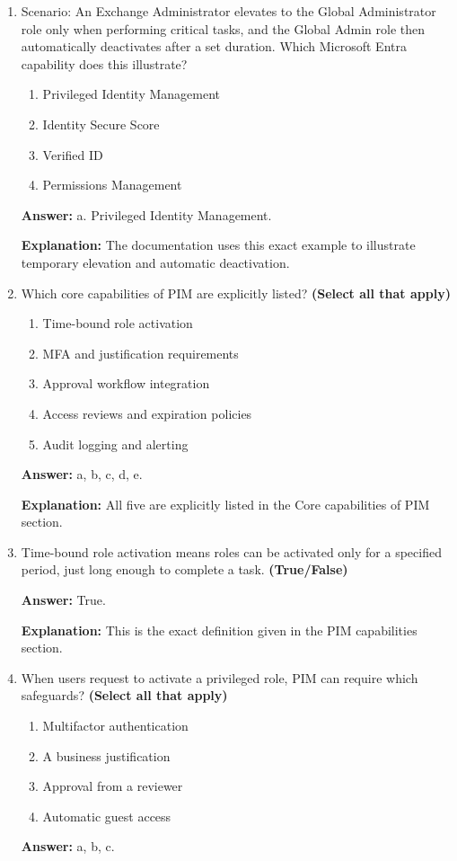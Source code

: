 \documentclass[10pt]{article}
\begin{document}
\begin{enumerate}[leftmargin=*]
\textbf{Explanation:} The documentation explicitly says this approach reduces the attack surface.

\item Scenario: An Exchange Administrator elevates to the Global Administrator role only when performing critical tasks, and the Global Admin role then automatically deactivates after a set duration. Which Microsoft Entra capability does this illustrate?
\begin{enumerate}[label=\alph*., leftmargin=1.5em]
\item Privileged Identity Management
\item Identity Secure Score
\item Verified ID
\item Permissions Management
\end{enumerate}
\textbf{Answer:} a. Privileged Identity Management.

\textbf{Explanation:} The documentation uses this exact example to illustrate temporary elevation and automatic deactivation.

\item Which core capabilities of PIM are explicitly listed? \textbf{(Select all that apply)}
\begin{enumerate}[label=\alph*., leftmargin=1.5em]
\item Time-bound role activation
\item MFA and justification requirements
\item Approval workflow integration
\item Access reviews and expiration policies
\item Audit logging and alerting
\end{enumerate}
\textbf{Answer:} a, b, c, d, e.

\textbf{Explanation:} All five are explicitly listed in the Core capabilities of PIM section.

\item Time-bound role activation means roles can be activated only for a specified period, just long enough to complete a task. \textbf{(True/False)}

\textbf{Answer:} True.

\textbf{Explanation:} This is the exact definition given in the PIM capabilities section.

\item When users request to activate a privileged role, PIM can require which safeguards? \textbf{(Select all that apply)}
\begin{enumerate}[label=\alph*., leftmargin=1.5em]
\item Multifactor authentication
\item A business justification
\item Approval from a reviewer
\item Automatic guest access
\end{enumerate}
\textbf{Answer:} a, b, c.


\end{enumerate}
\end{document}
